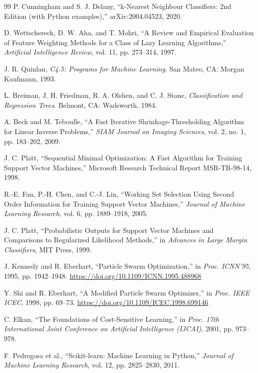 \begin{thebibliography}{99}
 P. Cunningham and S. J. Delany, ``k-Nearest Neighbour Classifiers: 2nd Edition (with Python examples),'' arXiv:2004.04523, 2020.

 D. Wettschereck, D. W. Aha, and T. Mohri, ``A Review and Empirical Evaluation of Feature Weighting Methods for a Class of Lazy Learning Algorithms,'' \emph{Artificial Intelligence Review}, vol. 11, pp. 273--314, 1997.

 J. R. Quinlan, \emph{C4.5: Programs for Machine Learning}. San Mateo, CA: Morgan Kaufmann, 1993.

 L. Breiman, J. H. Friedman, R. A. Olshen, and C. J. Stone, \emph{Classification and Regression Trees}. Belmont, CA: Wadsworth, 1984.

 A. Beck and M. Teboulle, ``A Fast Iterative Shrinkage-Thresholding Algorithm for Linear Inverse Problems,'' \emph{SIAM Journal on Imaging Sciences}, vol. 2, no. 1, pp. 183--202, 2009.

 J. C. Platt, ``Sequential Minimal Optimization: A Fast Algorithm for Training Support Vector Machines,'' Microsoft Research Technical Report MSR-TR-98-14, 1998.

 R.-E. Fan, P.-H. Chen, and C.-J. Lin, ``Working Set Selection Using Second Order Information for Training Support Vector Machines,'' \emph{Journal of Machine Learning Research}, vol. 6, pp. 1889--1918, 2005.

 J. C. Platt, ``Probabilistic Outputs for Support Vector Machines and Comparisons to Regularized Likelihood Methods,'' in \emph{Advances in Large Margin Classifiers}, MIT Press, 1999.

 J. Kennedy and R. Eberhart, ``Particle Swarm Optimization,'' in \emph{Proc. ICNN'95}, 1995, pp. 1942--1948. \url{https://doi.org/10.1109/ICNN.1995.488968}

 Y. Shi and R. Eberhart, ``A Modified Particle Swarm Optimizer,'' in \emph{Proc. IEEE ICEC}, 1998, pp. 69--73. \url{https://doi.org/10.1109/ICEC.1998.699146}

 C. Elkan, ``The Foundations of Cost-Sensitive Learning,'' in \emph{Proc. 17th International Joint Conference on Artificial Intelligence (IJCAI)}, 2001, pp. 973--978.

 F. Pedregosa et al., ``Scikit-learn: Machine Learning in Python,'' \emph{Journal of Machine Learning Research}, vol. 12, pp. 2825--2830, 2011.


\end{thebibliography}
